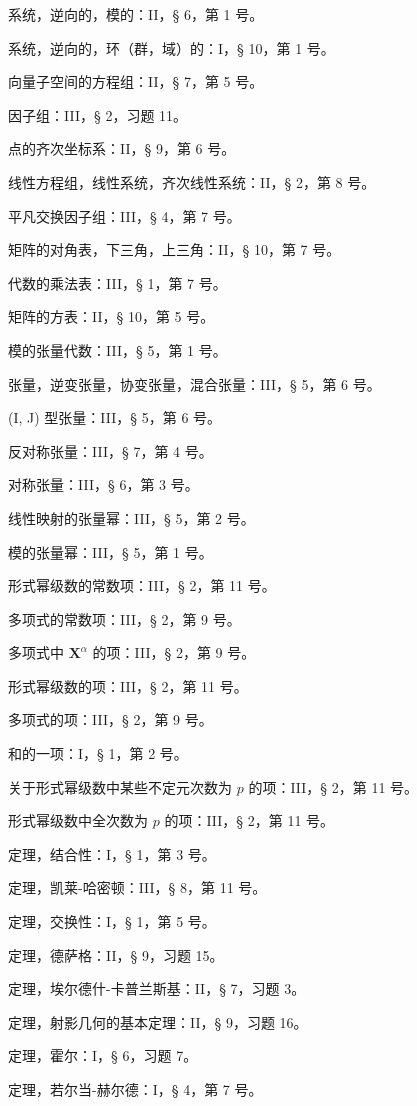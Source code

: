系统，逆向的，模的：II，§ 6，第 1 号。

系统，逆向的，环（群，域）的：I，§ 10，第 1 号。

向量子空间的方程组：II，§ 7，第 5 号。

因子组：III，§ 2，习题 11。

点的齐次坐标系：II，§ 9，第 6 号。

线性方程组，线性系统，齐次线性系统：II，§ 2，第 8 号。

平凡交换因子组：III，§ 4，第 7 号。

矩阵的对角表，下三角，上三角：II，§ 10，第 7 号。

代数的乘法表：III，§ 1，第 7 号。

矩阵的方表：II，§ 10，第 5 号。

模的张量代数：III，§ 5，第 1 号。

张量，逆变张量，协变张量，混合张量：III，§ 5，第 6 号。

(I, J) 型张量：III，§ 5，第 6 号。

反对称张量：III，§ 7，第 4 号。

对称张量：III，§ 6，第 3 号。

线性映射的张量幂：III，§ 5，第 2 号。

模的张量幂：III，§ 5，第 1 号。

形式幂级数的常数项：III，§ 2，第 11 号。

多项式的常数项：III，§ 2，第 9 号。

多项式中 \(\mathbf{X}^{\alpha}\) 的项：III，§ 2，第 9 号。

形式幂级数的项：III，§ 2，第 11 号。

多项式的项：III，§ 2，第 9 号。

和的一项：I，§ 1，第 2 号。

关于形式幂级数中某些不定元次数为 \(p\) 的项：III，§ 2，第 11 号。

形式幂级数中全次数为 \(p\) 的项：III，§ 2，第 11 号。

定理，结合性：I，§ 1，第 3 号。

定理，凯莱-哈密顿：III，§ 8，第 11 号。

定理，交换性：I，§ 1，第 5 号。

定理，德萨格：II，§ 9，习题 15。

定理，埃尔德什-卡普兰斯基：II，§ 7，习题 3。

定理，射影几何的基本定理：II，§ 9，习题 16。

定理，霍尔：I，§ 6，习题 7。

定理，若尔当-赫尔德：I，§ 4，第 7 号。

